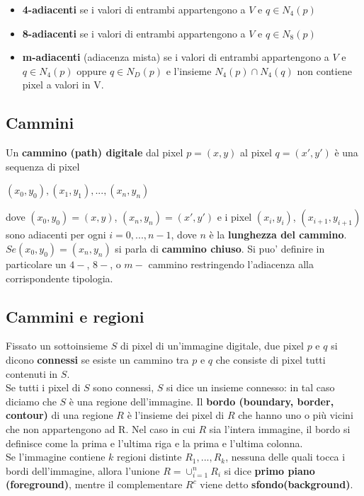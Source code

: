 \begin{itemize}
    \item \textbf{4-adiacenti} se i valori di entrambi appartengono a $V$ e $q
              \in N_4(p)$
    \item \textbf{8-adiacenti} se i valori di entrambi appartengono a $V$ e $q
              \in N_8(p)$
    \item \textbf{m-adiacenti} (adiacenza mista) se i valori di entrambi
          appartengono a $V$ e $q \in N_4(p)$ oppure $q \in N_D(p)$ e l'insieme
          $N_4(p) \cap N_4(q)$ non contiene pixel a valori in V.
\end{itemize}

\subsection{Cammini}

Un \textbf{cammino (path) digitale} dal pixel $p = (x,y)$ al pixel $q = (x',
    y')$ è una sequenza di pixel

\begin{center}
    $(x_0, y_0), (x_1, y_1), ... ,(x_n, y_n)$
\end{center}

dove $(x_0, y_0) = (x,y)$, $(x_n, y_n) = (x', y')$ e i pixel $(x_i, y_i)$,
$(x_{i+1}, y_{i+1})$ sono adiacenti per ogni $i=0, ... , n-1$, dove $n$ è la
\textbf{lunghezza del cammino}. $Se (x_0, y_0) = (x_n, y_n)$ si parla di
\textbf{cammino chiuso}. Si puo' definire in particolare un $4-$, $8-$, o $m-$
cammino restringendo l'adiacenza alla corrispondente tipologia.

\subsection{Cammini e regioni}

Fissato un sottoinsieme $S$ di pixel di un'immagine digitale, due pixel $p$ e
$q$ si dicono \textbf{connessi} se esiste un cammino tra $p$ e $q$ che consiste
di pixel tutti contenuti in $S$. \\Se tutti i pixel di $S$ sono connessi, $S$ si
dice un insieme connesso: in tal caso diciamo che $S$ è una regione
dell'immagine. Il \textbf{bordo (boundary, border, contour)} di una regione $R$
è l'insieme dei pixel di $R$ che hanno uno o più vicini che non appartengono ad
R. Nel caso in cui $R$ sia l'intera immagine, il bordo si definisce come la
prima e l'ultima riga e la prima e l'ultima colonna. \\Se l'immagine contiene
$k$ regioni distinte $R_1,..., R_k$, nessuna delle quali tocca i bordi
dell'immagine, allora l'unione $R = \cup_{i=1}^n R_i$ si dice \textbf{primo
    piano (foreground)}, mentre il complementare $R^c$ viene detto
\textbf{sfondo(background)}.

